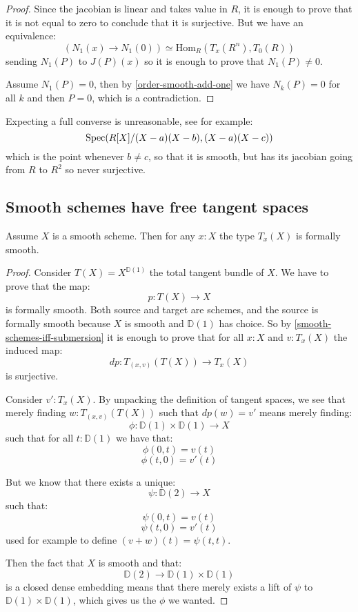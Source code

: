 \begin{proof}
Since the jacobian is linear and takes value in $R$, it is enough to prove that it is not equal to zero to conclude that it is surjective. But we have an equivalence:
\[(N_1(x)\to N_1(0)) \simeq \mathrm{Hom}_R(T_x(R^n),T_0(R))\]
sending $N_1(P)$ to $J(P)(x)$ so it is enough to prove that $N_1(P)\not=0$. 

Assume $N_1(P)=0$, then by \cref{order-smooth-add-one} we have $N_k(P)=0$ for all $k$ and then $P=0$, which is a contradiction.
\end{proof}

\begin{remark}
Expecting a full converse is unreasonable, see for example:
\[\operatorname{Spec}(R[X]/ (X-a)(X-b),(X-a)(X-c))\]
which is the point whenever $b\not=c$, so that it is smooth, but has its jacobian going from $R$ to $R^2$ so never surjective.
\end{remark}

\subsection{Smooth schemes have free tangent spaces}

\begin{lemma}\label{smooth-implies-smooth-tangent}
Assume $X$ is a smooth scheme. Then for any $x:X$ the type $T_x(X)$ is formally smooth.
\end{lemma}

\begin{proof}
Consider $T(X) = X^{\mathbb{D}(1)}$ the total tangent bundle of $X$. We have to prove that the map:
\[p:T(X)\to X\]
is formally smooth. Both source and target are schemes, and the source is formally smooth because $X$ is smooth and $\mathbb{D}(1)$ has choice. So by \cref{smooth-schemes-iff-submersion} it is enough to prove that for all $x:X$ and $v:T_x(X)$ the induced map:
\[dp:T_{(x,v)}(T(X))\to T_x(X)\]
is surjective. 

Consider $v':T_x(X)$. By unpacking the definition of tangent spaces, we see that merely finding $w:T_{(x,v)}(T(X))$ such that $dp(w) = v'$ means merely finding:
\[\phi : \mathbb{D}(1) \times \mathbb{D}(1) \to X\]
such that for all $t:\mathbb{D}(1)$ we have that:
\[\phi(0,t) = v(t)\]
\[\phi(t,0) = v'(t)\]

But we know that there exists a unique:
\[\psi : \mathbb{D}(2)\to X\]
such that:
\[\psi(0,t) = v(t)\]
\[\psi(t,0) = v'(t)\]
used for example to define $(v+w)(t) = \psi(t,t)$.

Then the fact that $X$ is smooth and that:
\[\mathbb{D}(2) \to\mathbb{D}(1) \times \mathbb{D}(1) \]
is a closed dense embedding means that there merely exists a lift of $\psi$ to $\mathbb{D}(1) \times \mathbb{D}(1)$, which gives us the $\phi$ we wanted.
\end{proof}

